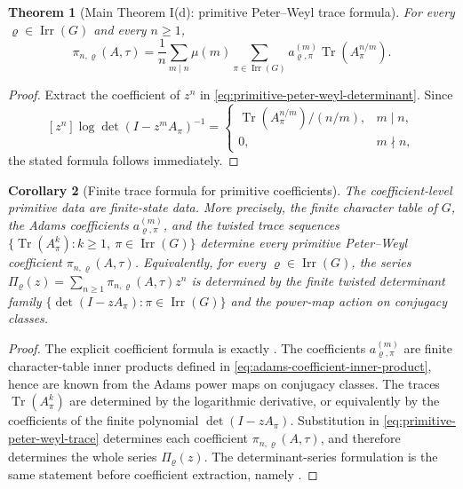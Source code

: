 \documentclass[11pt,a4paper]{amsart}
\theoremstyle{plain}
\newtheorem{theorem}{Theorem}[section]
\newtheorem{corollary}[theorem]{Corollary}
\theoremstyle{definition}
\theoremstyle{remark}
\DeclareMathOperator{\Tr}{Tr}
\DeclareMathOperator{\Irr}{Irr}
\begin{document}
\begin{theorem}[Main Theorem I(d): primitive Peter--Weyl trace formula]
  \label{thm:primitive-peter-weyl-trace}
  For every \(\varrho\in\Irr(G)\) and every \(n\ge 1\),
  \begin{equation}\label{eq:primitive-peter-weyl-trace}
    \pi_{n,\varrho}(A,\tau)
    =
    \frac{1}{n}\sum_{m\mid n}\mu(m)
      \sum_{\pi\in\Irr(G)}
        a_{\varrho,\pi}^{(m)}
        \Tr(A_\pi^{n/m}).
  \end{equation}
\end{theorem}

\begin{proof}
  Extract the coefficient of \(z^n\) in
  \eqref{eq:primitive-peter-weyl-determinant}. Since
  \[
    [z^n]\log\det(I-z^mA_\pi)^{-1}
    =
    \begin{cases}
      \Tr(A_\pi^{n/m})/(n/m), & m\mid n, \\
      0, & m\nmid n,
    \end{cases}
  \]
  the stated formula follows immediately.
\end{proof}

\begin{corollary}[Finite trace formula for primitive coefficients]
  \label{cor:primitive-peter-weyl-trace}
  The coefficient-level primitive data are finite-state data.  More
  precisely, the finite character table of \(G\), the Adams coefficients
  \(a_{\varrho,\pi}^{(m)}\), and the twisted trace sequences
  \(\{\Tr(A_\pi^k):k\ge1,\ \pi\in\Irr(G)\}\) determine every primitive
  Peter--Weyl coefficient \(\pi_{n,\varrho}(A,\tau)\). Equivalently, for
  every \(\varrho\in\Irr(G)\), the series \(\Pi_\varrho(z)
  =\sum_{n\ge1}\pi_{n,\varrho}(A,\tau)z^n\) is determined by the finite
  twisted determinant family \(\{\det(I-zA_\pi):\pi\in\Irr(G)\}\) and the
  power-map action on conjugacy classes.
\end{corollary}

\begin{proof}
  The explicit coefficient formula is exactly
  .  The coefficients
  \(a_{\varrho,\pi}^{(m)}\) are finite character-table inner products
  defined in \eqref{eq:adams-coefficient-inner-product}, hence are known
  from the Adams power maps on conjugacy classes.  The traces
  \(\Tr(A_\pi^k)\) are determined by the logarithmic derivative, or
  equivalently by the coefficients of the finite polynomial
  \(\det(I-zA_\pi)\). Substitution in
  \eqref{eq:primitive-peter-weyl-trace} determines each coefficient
  \(\pi_{n,\varrho}(A,\tau)\), and therefore determines the whole series
  \(\Pi_\varrho(z)\). The determinant-series formulation is the same
  statement before coefficient extraction, namely
  .
\end{proof}
\end{document}
